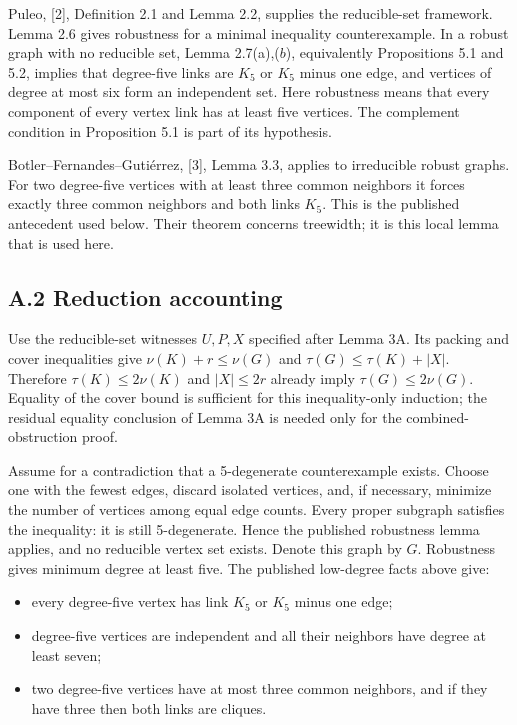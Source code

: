 \documentclass[11pt]{article}
\providecommand{\tightlist}{\setlength{\itemsep}{0pt}\setlength{\parskip}{0pt}}
\begin{document}
Puleo, {[}2{]}, Definition 2.1 and Lemma 2.2, supplies the reducible-set
framework. Lemma 2.6 gives robustness for a minimal inequality
counterexample. In a robust graph with no reducible set, Lemma
2.7(a),(\(b\)), equivalently Propositions 5.1 and 5.2, implies that
degree-five links are \(K_5\) or \(K_5\) minus one edge, and vertices of
degree at most six form an independent set. Here robustness means that
every component of every vertex link has at least five vertices. The
complement condition in Proposition 5.1 is part of its hypothesis.

Botler--Fernandes--Gutiérrez, {[}3{]}, Lemma 3.3, applies to irreducible
robust graphs. For two degree-five vertices with at least three common
neighbors it forces exactly three common neighbors and both links
\(K_5\). This is the published antecedent used below. Their theorem
concerns treewidth; it is this local lemma that is used here.

\subsection{A.2 Reduction accounting}\label{a.2-reduction-accounting}

Use the reducible-set witnesses \(U,P,X\) specified after Lemma 3A. Its
packing and cover inequalities give \(\nu(K)+r\le\nu(G)\) and
\(\tau(G)\le\tau(K)+|X|\). Therefore \(\tau(K)\le2\nu(K)\) and
\(|X|\le2r\) already imply \(\tau(G)\le2\nu(G)\). Equality of the cover
bound is sufficient for this inequality-only induction; the residual
equality conclusion of Lemma 3A is needed only for the
combined-obstruction proof.

Assume for a contradiction that a 5-degenerate counterexample exists.
Choose one with the fewest edges, discard isolated vertices, and, if
necessary, minimize the number of vertices among equal edge counts.
Every proper subgraph satisfies the inequality: it is still
5-degenerate. Hence the published robustness lemma applies, and no
reducible vertex set exists. Denote this graph by \(G\). Robustness
gives minimum degree at least five. The published low-degree facts above
give:

\begin{itemize}
\tightlist
\item
  every degree-five vertex has link \(K_5\) or \(K_5\) minus one edge;
\item
  degree-five vertices are independent and all their neighbors have
  degree at least seven;
\item
  two degree-five vertices have at most three common neighbors, and if
  they have three then both links are cliques.
\end{itemize}
\end{document}
